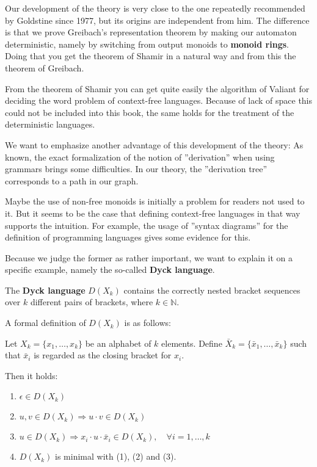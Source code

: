 Our development of the theory is very close to the one repeatedly recommended by
Goldstine since 1977, but its origins are independent from him. The difference
is that we prove Greibach's representation theorem by making our automaton deterministic,
namely by switching from output monoids to {\bf monoid rings}. Doing that you
get the theorem of Shamir in a natural way and from this the theorem of Greibach.

From the theorem of Shamir you can get quite easily the algorithm of Valiant for
deciding the word problem of context-free languages. Because of lack of space
this could not be included into this book, the same holds for the treatment of
the  deterministic languages.

We want to emphasize another advantage of this development of the theory: As
known, the exact formalization of the notion of ''derivation'' when using
grammars brings some difficulties. In our theory, the ''derivation tree''
corresponds to a path in our graph.

Maybe the use of non-free monoids is initially a problem for readers not used to
it. But it seems to be the case that defining context-free
languages in that way supports the intuition. For example, the usage of ''syntax
diagrams'' for the definition of programming languages gives some evidence for
this.

Because we judge the former as rather important, we want to explain it on a
specific example, namely the so-called {\bf Dyck language}.

The {\bf Dyck language} $D(X_k)$ contains the correctly nested bracket sequences
over $k$ different pairs of brackets, where $k \in \mathbb{N}$.

A formal definition of $D(X_k)$ is as follows:

Let $X_k = \{ x_1, \ldots, x_k \}$ be an alphabet of $k$ elements. Define
$\bar{X}_k = \{ \bar{x}_1, \ldots, \bar{x}_k \}$ such that $\bar{x}_i$ is regarded as the
closing bracket for $x_i$.

Then it holds:

\begin{enumerate}
  \item $\epsilon \in D(X_k)$
  \item $u, v \in D(X_k) \Rightarrow u \cdot v \in D(X_k)$
  \item $u \in D(X_k) \Rightarrow x_i \cdot u \cdot \bar{x}_i \in D(X_k),\quad
  \forall i = 1, \ldots, k$
  \item $D(X_k)$ is minimal with (1), (2) and (3). 
\end{enumerate}

